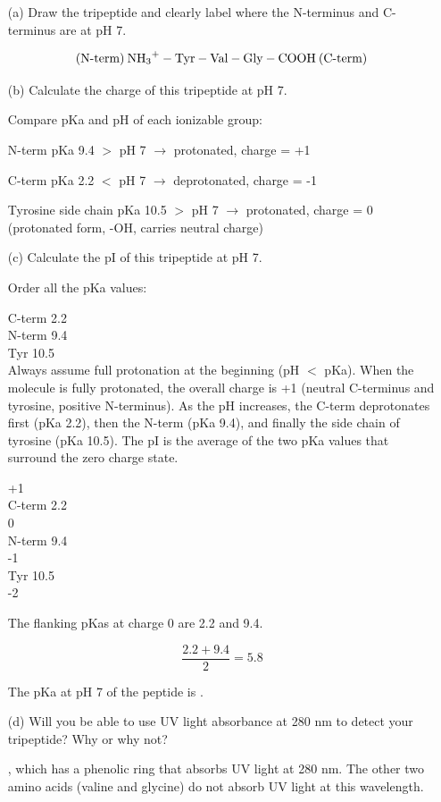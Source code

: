 \documentclass[letterpaper, 12pt]{article}
\begin{document}
\begin{itemize}
\item[(a)] Draw the tripeptide and clearly label where the N-terminus and C-terminus are at pH 7.

$$ \text{(N-term)} \: \ce{NH3+ - Tyr - Val - Gly - COOH} \: \text{(C-term)} $$

\item[(b)] Calculate the charge of this tripeptide at pH 7.

Compare pKa and pH of each ionizable group:

N-term pKa 9.4 $>$ pH 7 $\rightarrow$ protonated, charge = +1

C-term pKa 2.2 $<$ pH 7 $\rightarrow$ deprotonated, charge = -1

Tyrosine side chain pKa 10.5 $>$ pH 7 $\rightarrow$ protonated, charge = 0 (protonated form, -OH, carries neutral charge)


\item[(c)] Calculate the pI of this tripeptide at pH 7.

Order all the pKa values:

C-term 2.2 \\
N-term 9.4 \\
Tyr 10.5 \\

Always assume full protonation at the beginning (pH $<$ pKa). When the molecule is fully protonated, the overall charge is +1 (neutral C-terminus and tyrosine, positive N-terminus). As the pH increases, the C-term deprotonates first (pKa 2.2), then the N-term (pKa 9.4), and finally the side chain of tyrosine (pKa 10.5). The pI is the average of the two pKa values that surround the zero charge state.

+1 \\
C-term 2.2 \\
0 \\
N-term 9.4 \\
-1 \\
Tyr 10.5 \\
-2

The flanking pKas at charge 0 are 2.2 and 9.4.

$$ \frac{2.2 + 9.4}{2} = 5.8 $$

The pKa at pH 7 of the peptide is .

\item[(d)] Will you be able to use UV light absorbance at 280 nm to detect your tripeptide? Why or why not?

, which has a phenolic ring that absorbs UV light at 280 nm. The other two amino acids (valine and glycine) do not absorb UV light at this wavelength.

\end{itemize}
\end{document}
